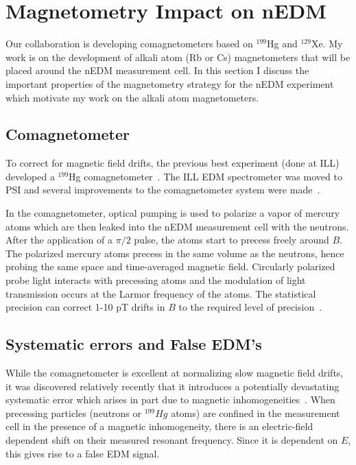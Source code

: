 \section{ Magnetometry Impact on nEDM}


Our collaboration is developing comagnetometers based on $^{199}$Hg
and $^{129}$Xe.  My work is on the development of alkali atom (Rb or
Cs) magnetometers that will be placed around the nEDM measurement
cell.  In this section I discuss the important properties of the
magnetometry strategy for the nEDM experiment which motivate my work
on the alkali atom magnetometers.

\subsection{Comagnetometer}

To correct for magnetic field drifts, the previous best experiment
(done at ILL) developed a $^{199}$Hg
comagnetometer~\cite{their-nim-article-by-green-et-al,PhysRevLett.97.131801,PhysRevLett.102.101601}.
The ILL EDM spectrometer was moved to PSI and several improvements to
the comagnetometer system were made~\cite{a-paper-from-2018}.

In the comagnetometer, optical pumping is used to polarize a vapor of
mercury atoms which are then leaked into the nEDM measurement cell
with the neutrons.  After the application of a $\pi/2$ pulse, the
atoms start to precess freely around $B$.  The polarized mercury atoms
precess in the same volume as the neutrons, hence probing the same
space and time-averaged magnetic field.  Circularly polarized probe
light interacts with precessing atoms and the modulation of light
transmission occurs at the Larmor frequency of the atoms.  The
statistical precision can correct 1-10 pT drifts in $B$ to the
required level of
precision~\cite{a-paper-from-2018,afach:in2p3-01062292}.


\subsection{Systematic errors and False EDM's}

While the comagnetometer is excellent at normalizing slow magnetic
field drifts, it was discovered relatively recently that it introduces
a potentially devastating systematic error which arises in part due to
magnetic inhomogeneities~\cite{PhysRevA.70.032102}.  When precessing
particles (neutrons or $^{199}Hg$ atoms) are confined in the
measurement cell in the presence of a magnetic inhomogeneity, there is
an electric-field dependent shift on their measured resonant
frequency.  Since it is dependent on $E$, this gives rise to a false
EDM signal.

